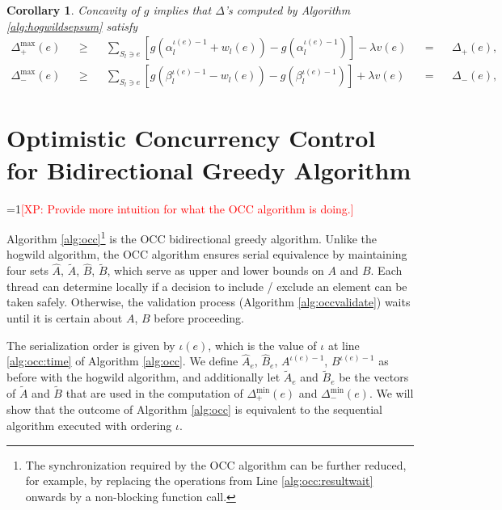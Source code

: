 \documentclass{article} %
\newtheorem{cor}[thm]{Corollary}
\newcommand{\Comments}{1}
\newcommand{\note}[2]{\ifnum\Comments=1\textcolor{#1}{#2}\fi}
\newcommand{\xinghao}[1]{\note{red}{[XP: #1]}}
\begin{document}
\begin{cor} Concavity of $g$ implies that $\Delta$'s computed by Algorithm \ref{alg:hogwildsepsum} satisfy
\begin{align*}
\Delta_+^{\max}(e)
&&\geq&& \sum_{S_l\ni e} \left[g(\alpha_l^{\iota(e)-1} + w_l(e)) - g(\alpha_l^{\iota(e)-1})\right] - \lambda v(e)
&&=&& \Delta_+(e),\\
\Delta_-^{\max}(e)
&&\geq&& \sum_{S_l\ni e} \left[g(\beta_l^{\iota(e)-1} - w_l(e)) - g(\beta_l^{\iota(e)-1})\right] + \lambda v(e)
&&=&& \Delta_-(e),
\end{align*}
\end{cor}








\section{Optimistic Concurrency Control for Bidirectional Greedy Algorithm}
\xinghao{Provide more intuition for what the OCC algorithm is doing.}

Algorithm \ref{alg:occ}\footnote{The synchronization required by the OCC algorithm can be further reduced, for example, by replacing the operations from Line \ref{alg:occ:resultwait} onwards by a non-blocking function call.} is the OCC bidirectional greedy algorithm.
Unlike the hogwild algorithm, the OCC algorithm ensures serial equivalence by maintaining four sets $\hat{A}$, $\tilde{A}$, $\hat{B}$, $\tilde{B}$, which serve as upper and lower bounds on $A$ and $B$.
Each thread can determine locally if a decision to include / exclude an element can be taken safely.
Otherwise, the validation process (Algorithm \ref{alg:occvalidate}) waits until it is certain about $A$, $B$ before proceeding.

The serialization order is given by $\iota(e)$, which is the value of $\iota$ at line \ref{alg:occ:time} of Algorithm \ref{alg:occ}.
We define $\hat{A}_e$, $\hat{B}_e$, $A^{\iota(e)-1}$, $B^{\iota(e)-1}$ as before with the hogwild algorithm, and additionally let $\tilde{A}_e$ and $\tilde{B}_e$ be the vectors of $\tilde{A}$ and $\tilde{B}$ that are used in the computation of $\Delta_+^{\min}(e)$ and $\Delta_-^{\min}(e)$.
We will show that the outcome of Algorithm \ref{alg:occ} is equivalent to the sequential algorithm executed with ordering $\iota$.
\end{document}
